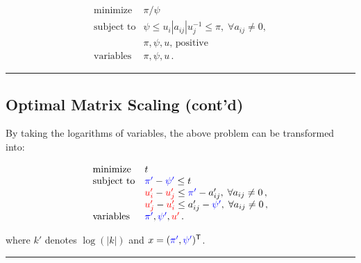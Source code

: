 \documentclass[
]{article}
\begin{document}
\[\begin{array}{ll}
  \text{minimize}   &   \pi/\psi  \\
  \text{subject to} &   \psi \le u_i |a_{ij}| u_j^{-1} \le \pi, \; \forall a_{ij} \neq 0 , \\
                    &   \pi, \psi, u, \, \text{positive} \\
  \text{variables}  &   \pi, \psi, u \, .
  \end{array}\]

\begin{center}\rule{0.5\linewidth}{0.5pt}\end{center}

\subsection{Optimal Matrix Scaling
(cont'd)}\label{optimal-matrix-scaling-contd}

By taking the logarithms of variables, the above problem can be
transformed into:

\[\begin{array}{ll}
  \text{minimize}   &   t \\
  \text{subject to} &   {\color{blue}\pi'} - {\color{blue}\psi'} \le t \\
                    &   {\color{red}u_i'} - {\color{red}u_j'}  \le {\color{blue}\pi'} - a_{ij}', \; \forall a_{ij} \neq 0 \,, \\
                    &   {\color{red}u_j'} - {\color{red}u_i'} \le a_{ij}' - {\color{blue}\psi'}, \; \forall a_{ij} \neq 0 \,, \\
  \text{variables}  &   {\color{blue}\pi'}, {\color{blue}\psi'}, {\color{red}u'} \, .
  \end{array}\]

where \(k'\) denotes \(\log( | k | )\) and
\(x = ({\color{blue}\pi'}, {\color{blue}\psi'} )^\mathsf{T}\).

\begin{center}\rule{0.5\linewidth}{0.5pt}\end{center}
\end{document}
